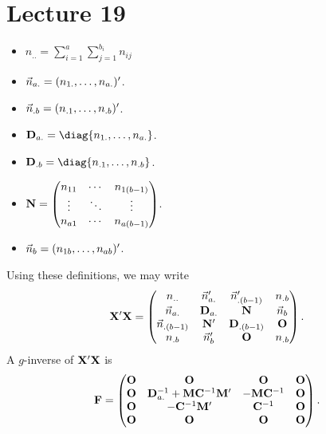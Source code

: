 \section{Lecture 19}
\begin{itemize}
    \item $ n_{..}=\sum_{i=1}^{a}\sum_{j=1}^{b_i} n_{ij} $
    \item $ \vec{n}_{a.}=(n_{1.},\ldots,n_{a.})' $.
    \item $ \vec{n}_{.b}=(n_{.1},\ldots,n_{.b})' $.
    \item $ \Matrix{D}_{a.}=\diag{n_{1.},\ldots,n_{a.}} $.
    \item $ \Matrix{D}_{.b}=\diag{n_{.1},\ldots,n_{.b}} $.
    \item $ \mathbf{N}=\begin{pmatrix}
                  n_{11} & \cdots & n_{1(b-1)} \\
                  \vdots & \ddots & \vdots     \\
                  n_{a1} & \cdots & n_{a(b-1)}
              \end{pmatrix} $.
    \item $ \vec{n}_{b}=(n_{1b},\ldots,n_{ab})' $.
\end{itemize}
Using these definitions, we may write
\[ \mathbf{X}'\mathbf{X}=\begin{pmatrix}
        n_{..}              & \vec{n}_{a.}' & \vec{n}_{.(b-1)}' & n_{.b}       \\
        \vec{n}_{a.}     & \mathbf{D}_{a.}  & \mathbf{N}           & \vec{n}_b \\
        \vec{n}_{.(b-1)} & \mathbf{N}'      & \mathbf{D}_{.(b-1)}  & \mathbf{O}   \\
        n_{.b}              & \vec{n}_{b}'  & \mathbf{O}           & n_{.b}
    \end{pmatrix}. \]
A $ g $-inverse of $ \mathbf{X}'\mathbf{X} $ is
\[ \mathbf{F}=\begin{pmatrix}
        \mathbf{O} & \mathbf{O}                                                & \mathbf{O}                 & \mathbf{O} \\
        \mathbf{O} & \mathbf{D}_{a.}^{-1}+\mathbf{M}\mathbf{C}^{-1}\mathbf{M}' & -\mathbf{M}\mathbf{C}^{-1} & \mathbf{O} \\
        \mathbf{O} & -\mathbf{C}^{-1}\mathbf{M}'                               & \mathbf{C}^{-1}            & \mathbf{O} \\
        \mathbf{O} & \mathbf{O}                                                & \mathbf{O}                 & \mathbf{O} \\
    \end{pmatrix}. \]
